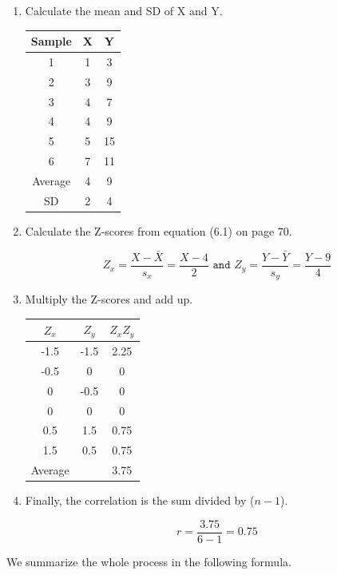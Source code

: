 \documentclass[11pt, chapterprefix=true]{scrbook}\usepackage[]{graphicx}\usepackage[]{color}
\begin{document}
\begin{enumerate}
\item Calculate the mean and SD of X and Y.

\begin{table}[ht]
\centering
\begin{tabular}{@{} ccc @{}} \hline
Sample & X & Y \\ \hline
1 & 1 & 3 \\
2 & 3 & 9 \\
3 & 4 & 7 \\
4 & 4 & 9 \\
5 & 5 & 15 \\
6 & 7 & 11 \\ \hline
Average & 4 & 9 \\
SD  & 2 & 4 \\ \hline
\end{tabular}
\end{table}

\item Calculate the Z-scores from equation (6.1) on page 70.  

$$ Z_x = \frac{X - \bar{X}}{s_x} = \frac{X - 4}{2} \texttt{ and } Z_y = \frac{Y - \bar{Y}}{s_y} = \frac{Y - 9}{4} $$

\item Multiply the Z-scores and add up.

\begin{table}[ht]
\centering
\begin{tabular}{@{} ccc @{}} \hline
$Z_x$ & $Z_y$ & $Z_x Z_y$ \\ \hline
-1.5 & -1.5 & 2.25 \\
-0.5 & 0 & 0 \\
0 & -0.5 & 0 \\
0 & 0 & 0 \\
0.5 & 1.5 & 0.75 \\
1.5 & 0.5 & 0.75 \\ \hline
Average &  & 3.75 \\
\end{tabular}
\end{table}

\item Finally, the correlation is the sum divided by ($n - 1$).

$$ r = \frac{3.75}{6 - 1} = 0.75 $$
\end{enumerate}

We summarize the whole process in the following formula. 

\begin{center}
\end{center}
\end{document}
